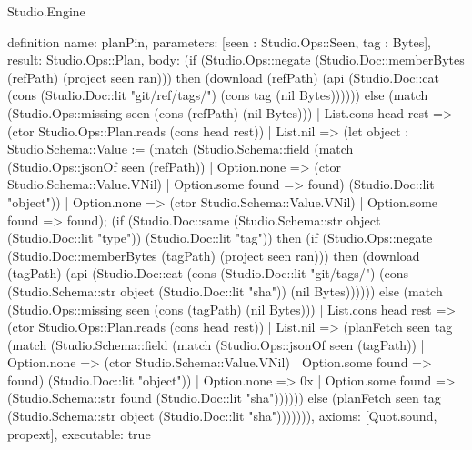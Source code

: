 \begin{lexlean}{Studio.Engine}
\begin{semanticmodule}
definition{
  name: planPin,
  parameters: [seen : Studio.Ops::Seen, tag : Bytes],
  result: Studio.Ops::Plan,
  body: (if (Studio.Ops::negate (Studio.Doc::memberBytes (refPath) (project seen ran))) then (download (refPath) (api (Studio.Doc::cat (cons (Studio.Doc::lit "git/ref/tags/") (cons tag (nil Bytes)))))) else (match (Studio.Ops::missing seen (cons (refPath) (nil Bytes)))
    | List.cons head rest => (ctor Studio.Ops::Plan.reads (cons head rest))
    | List.nil => (let object : Studio.Schema::Value := (match (Studio.Schema::field (match (Studio.Ops::jsonOf seen (refPath))
          | Option.none => (ctor Studio.Schema::Value.VNil)
          | Option.some found => found) (Studio.Doc::lit "object"))
        | Option.none => (ctor Studio.Schema::Value.VNil)
        | Option.some found => found); (if (Studio.Doc::same (Studio.Schema::str object (Studio.Doc::lit "type")) (Studio.Doc::lit "tag")) then (if (Studio.Ops::negate (Studio.Doc::memberBytes (tagPath) (project seen ran))) then (download (tagPath) (api (Studio.Doc::cat (cons (Studio.Doc::lit "git/tags/") (cons (Studio.Schema::str object (Studio.Doc::lit "sha")) (nil Bytes)))))) else (match (Studio.Ops::missing seen (cons (tagPath) (nil Bytes)))
          | List.cons head rest => (ctor Studio.Ops::Plan.reads (cons head rest))
          | List.nil => (planFetch seen tag (match (Studio.Schema::field (match (Studio.Ops::jsonOf seen (tagPath))
              | Option.none => (ctor Studio.Schema::Value.VNil)
              | Option.some found => found) (Studio.Doc::lit "object"))
            | Option.none => 0x
            | Option.some found => (Studio.Schema::str found (Studio.Doc::lit "sha")))))) else (planFetch seen tag (Studio.Schema::str object (Studio.Doc::lit "sha"))))))),
  axioms: [Quot.sound, propext],
  executable: true
}


\end{semanticmodule}
\end{lexlean}
